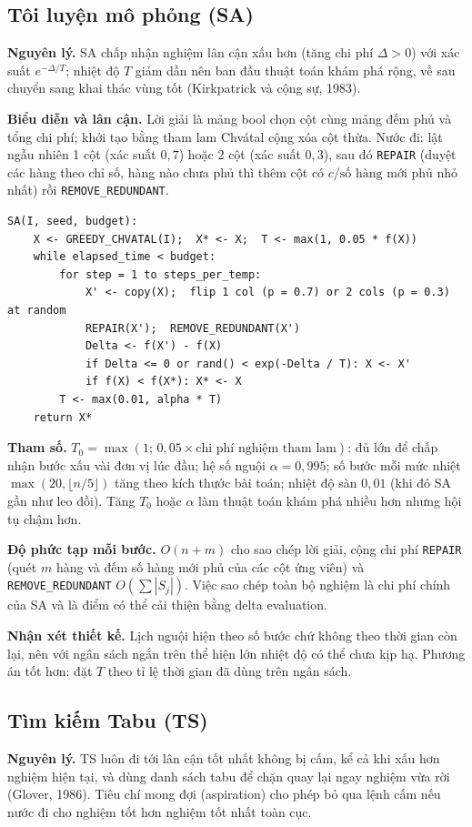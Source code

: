 \documentclass[a4paper,12pt]{article}
\begin{document}
\subsection{Tôi luyện mô phỏng (SA)}
\textbf{Nguyên lý.} SA chấp nhận nghiệm lân cận xấu hơn (tăng chi phí $\Delta>0$) với xác suất $e^{-\Delta/T}$; nhiệt độ $T$ giảm dần nên ban đầu thuật toán khám phá rộng, về sau chuyển sang khai thác vùng tốt (Kirkpatrick và cộng sự, 1983).

\textbf{Biểu diễn và lân cận.} Lời giải là mảng bool chọn cột cùng mảng đếm phủ và tổng chi phí; khởi tạo bằng tham lam Chvátal cộng xóa cột thừa. Nước đi: lật ngẫu nhiên 1 cột (xác suất $0{,}7$) hoặc 2 cột (xác suất $0{,}3$), sau đó \texttt{REPAIR} (duyệt các hàng theo chỉ số, hàng nào chưa phủ thì thêm cột có $c/\text{số hàng mới phủ}$ nhỏ nhất) rồi \texttt{REMOVE\_REDUNDANT}.

\begin{Verbatim}
SA(I, seed, budget):
    X <- GREEDY_CHVATAL(I);  X* <- X;  T <- max(1, 0.05 * f(X))
    while elapsed_time < budget:
        for step = 1 to steps_per_temp:
            X' <- copy(X);  flip 1 col (p = 0.7) or 2 cols (p = 0.3) at random
            REPAIR(X');  REMOVE_REDUNDANT(X')
            Delta <- f(X') - f(X)
            if Delta <= 0 or rand() < exp(-Delta / T): X <- X'
            if f(X) < f(X*): X* <- X
        T <- max(0.01, alpha * T)
    return X*
\end{Verbatim}

\textbf{Tham số.} $T_0=\max(1;\,0{,}05\times\text{chi phí nghiệm tham lam})$: đủ lớn để chấp nhận bước xấu vài đơn vị lúc đầu; hệ số nguội $\alpha=0{,}995$; số bước mỗi mức nhiệt $\max(20,\lfloor n/5\rfloor)$ tăng theo kích thước bài toán; nhiệt độ sàn $0{,}01$ (khi đó SA gần như leo đồi). Tăng $T_0$ hoặc $\alpha$ làm thuật toán khám phá nhiều hơn nhưng hội tụ chậm hơn.

\textbf{Độ phức tạp mỗi bước.} $O(n+m)$ cho sao chép lời giải, cộng chi phí \texttt{REPAIR} (quét $m$ hàng và đếm số hàng mới phủ của các cột ứng viên) và \texttt{REMOVE\_REDUNDANT} $O(\sum|S_j|)$. Việc sao chép toàn bộ nghiệm là chi phí chính của SA và là điểm có thể cải thiện bằng delta evaluation.

\textbf{Nhận xét thiết kế.} Lịch nguội hiện theo số bước chứ không theo thời gian còn lại, nên với ngân sách ngắn trên thể hiện lớn nhiệt độ có thể chưa kịp hạ. Phương án tốt hơn: đặt $T$ theo tỉ lệ thời gian đã dùng trên ngân sách.

\subsection{Tìm kiếm Tabu (TS)}
\textbf{Nguyên lý.} TS luôn đi tới lân cận tốt nhất không bị cấm, kể cả khi xấu hơn nghiệm hiện tại, và dùng danh sách tabu để chặn quay lại ngay nghiệm vừa rời (Glover, 1986). Tiêu chí mong đợi (aspiration) cho phép bỏ qua lệnh cấm nếu nước đi cho nghiệm tốt hơn nghiệm tốt nhất toàn cục.
\end{document}
